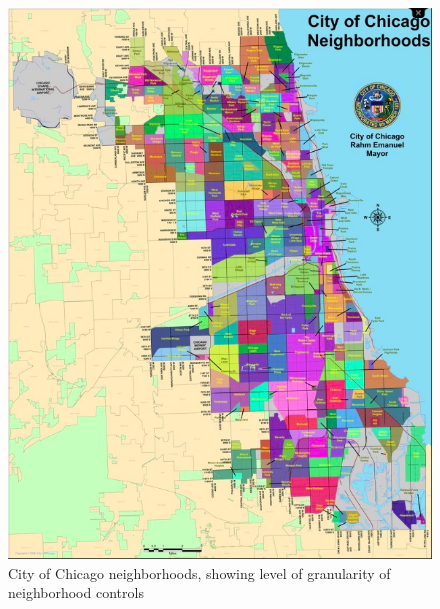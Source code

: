 \begin{figure}\centering
\includegraphics[width=.8\textwidth]{figures/chicago_city_neighborhoods}
\caption[City of Chicago neighborhoods]{City of Chicago neighborhoods, showing level of granularity of neighborhood controls}
\end{figure}


